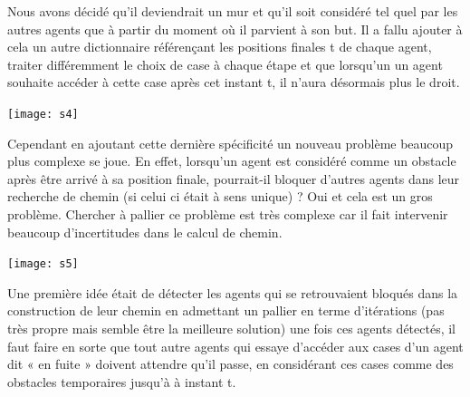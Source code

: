 \documentclass{article}
\begin{document}
Nous avons décidé qu’il deviendrait un mur et qu’il soit considéré tel quel par les autres agents que à partir du moment où il parvient à son but. Il a fallu ajouter à cela un autre dictionnaire référençant les positions finales t de chaque agent, traiter différemment le choix de case à chaque étape et que lorsqu’un un agent souhaite accéder à cette case après cet instant t, il n’aura désormais plus le droit. 
\\
\begin{center}
	\texttt{[image: s4]}
\end{center}

Cependant en ajoutant cette dernière spécificité un nouveau problème beaucoup plus complexe se joue. En effet, lorsqu’un agent est considéré comme un obstacle après être arrivé à sa position finale, pourrait-il bloquer d’autres agents dans leur recherche de chemin (si celui ci était à sens unique) ? Oui et cela est un gros problème. Chercher à pallier ce problème est très complexe car il fait intervenir beaucoup d’incertitudes dans le calcul de chemin. \\

\begin{center}
	\texttt{[image: s5]}
\end{center}

Une première idée était de détecter les agents qui se retrouvaient bloqués dans la construction de leur chemin en admettant un pallier en terme d’itérations (pas très propre mais semble être la meilleure solution) une fois ces agents détectés, il faut faire en sorte que tout autre agents qui essaye d’accéder aux cases d’un agent dit « en fuite » doivent attendre qu’il passe, en considérant ces cases comme des obstacles temporaires jusqu'à à instant t.
\end{document}
